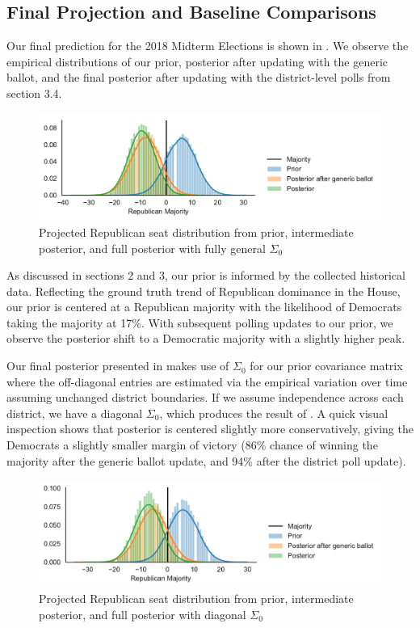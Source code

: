 \documentclass[11pt]{article}
\begin{document}
\subsection{Final Projection and Baseline Comparisons}
Our final prediction for the 2018 Midterm Elections is shown in . We observe the empirical distributions of our prior, posterior after updating with the generic ballot, and the final posterior after updating with the district-level polls from section 3.4.

\begin{figure}[tbh]
  \centering
  \includegraphics[width=\textwidth]{rep_seats.pdf}
  \caption{Projected Republican seat distribution from prior, intermediate
  posterior, and full posterior with fully general $\Sigma_0$}
  \label{fig:hists}
\end{figure}

As discussed in sections 2 and 3, our prior is informed by the collected historical data. Reflecting the ground truth trend of Republican dominance in the House, our prior is centered at a Republican majority with the likelihood of Democrats taking the majority at 17\%. With subsequent polling updates to our prior, we observe the posterior shift to a Democratic majority with a slightly higher peak.

Our final posterior presented in  makes use of $\Sigma_0$ for our prior covariance matrix where the off-diagonal entries are estimated via the empirical variation over time assuming unchanged district boundaries. If we assume independence across each district, we have a diagonal $\Sigma_0$, which produces the result of . A quick visual inspection shows that posterior is centered slightly more conservatively, giving the Democrats a slightly smaller margin of victory (86\% chance of winning the majority after the generic ballot update, and 94\% after the district poll update).

\begin{figure}[tbh]
  \centering
  \includegraphics[width=\textwidth]{rep_seats_with_diagonal_prior.pdf}
  \caption{Projected Republican seat distribution from prior, intermediate
  posterior, and full posterior with diagonal $\Sigma_0$}
  \label{fig:diagonal_prior}
\end{figure}
\end{document}

